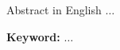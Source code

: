 \renewcommand{\thesisabstracthead}{ABSTRACT}
\renewcommand{\thesistitle}{\thesistitleenglish}
\begin{thesisabstract}
  
  Abstract in English $\ldots$
  
  \vspace{\baselineskip}
  \noindent
  \textbf{Keyword:} $\ldots$

\end{thesisabstract}

